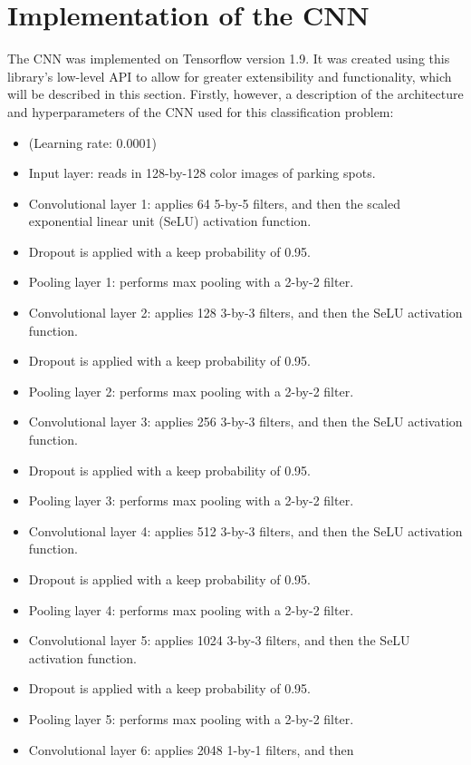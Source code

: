 \documentclass[a4paper, 11pt]{article} %
\begin{document}
\section{Implementation of the CNN}
	The CNN was implemented on Tensorflow version 1.9. It was created using this library's low-level API to
	allow for greater extensibility and functionality, which will be described in this section. Firstly, however,
	a description of the architecture and hyperparameters of the CNN used for this classification problem:
	\begin{itemize}
		\setlength\itemsep{-3mm}
		\item[] (Learning rate: 0.0001)
		\item[] Input layer: reads in 128-by-128 color images of parking spots.
		\item[] Convolutional layer 1: applies 64 5-by-5 filters, and then the 
		scaled exponential linear unit (SeLU) activation function.
		\item[] Dropout is applied with a keep probability of 0.95.
		\item[] Pooling layer 1: performs max pooling with a 2-by-2 filter.
		\item[] Convolutional layer 2: applies 128 3-by-3 filters, and then the 
		SeLU activation function.
		\item[] Dropout is applied with a keep probability of 0.95.
		\item[] Pooling layer 2: performs max pooling with a 2-by-2 filter.
		\item[] Convolutional layer 3: applies 256 3-by-3 filters, and then the 
		SeLU activation function.
		\item[] Dropout is applied with a keep probability of 0.95.
		\item[] Pooling layer 3: performs max pooling with a 2-by-2 filter.
		\item[] Convolutional layer 4: applies 512 3-by-3 filters, and then the 
		SeLU activation function.
		\item[] Dropout is applied with a keep probability of 0.95.
		\item[] Pooling layer 4: performs max pooling with a 2-by-2 filter.
		\item[] Convolutional layer 5: applies 1024 3-by-3 filters, and then 
		the SeLU activation function.
		\item[] Dropout is applied with a keep probability of 0.95.
		\item[] Pooling layer 5: performs max pooling with a 2-by-2 filter.
		\item[] Convolutional layer 6: applies 2048 1-by-1 filters, and then 

\end{itemize}
\end{document}
